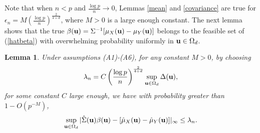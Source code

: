 \documentclass[11pt]{article}
\newtheorem{lem}{Lemma}
\theoremstyle{definition}
\begin{document}
 
 
 
 Note that when $n<p$ and $\frac{\log p}{n}\rightarrow 0$, Lemmas \ref{mean} and \ref{covariance} are true for $\epsilon_n=M\left(\frac{\log p}{n}\right)^{\frac{2}{4+d}}$, where $M>0$ is a large enough constant. The next lemma shows that the true $\beta({\bf u})=\Sigma^{-1}[\mu_X({\bf u})-\mu_Y({\bf u})]$ belongs to the feasible set of (\ref{hatbeta}) with overwhelming probability uniformly in ${\bf u}\in\Omega_d$.
 
 
 
 \begin{lem}\label{feasible}
 	Under assumptions (A1)-(A6),
 	for any constant $M>0$, by choosing
 	$${\lambda}_n=C\left(\frac{\log p}{n}\right)^{\frac{2}{4+d}}\sup_{{\bf u}\in \Omega_d}\Delta({\bf u}),$$
 	for some constant $C$
 	large enough, we have with probability greater than
 	$1-{O}(p^{-M})$,
 	\begin{eqnarray*}
 		\sup_{{\bf u}\in\Omega_d}|\hat{\Sigma}({\bf u})\beta({\bf u})-[\hat{\mu}_X({\bf u})-\hat{\mu}_Y({\bf u})]|_{\infty}\leq {\lambda}_{n}.
 	\end{eqnarray*}
 \end{lem}
\end{document}
